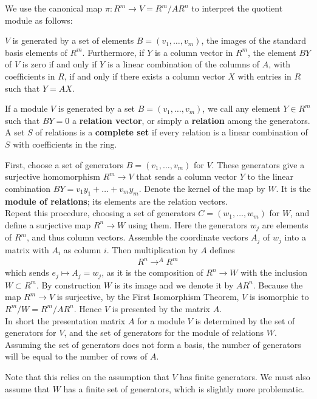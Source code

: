 \documentclass{memoir}
\begin{document}
We use the canonical map \(\pi:R^{m}\to V = R^{m} / AR^{n}\) to interpret the quotient module as follows:
\begin{prop}
\(V\) is generated by a set of elements \(B = (v_1,\ldots,v_m)\), the images of the standard basis elements of \(R^{m}\). Furthermore, if \(Y\) is a column vector in \(R^{m}\), the element \(BY\) of \(V\) is zero if and only if \(Y\) is a linear combination of the columns of \(A\), with coefficients in \(R\), if and only if there exists a column vector \(X\) with entries in \(R\) such that \(Y=AX\).
\end{prop}
If a module \(V\) is generated by a set \(B = (v_1,\ldots,v_m)\), we call any element \(Y \in R^{m}\) such that \(BY = 0\) a \textbf{relation vector}, or simply a \textbf{relation} among the generators. A set \(S\) of relations is a \textbf{complete set} if every relation is a linear combination of \(S\) with coefficients in the ring.
\begin{prop}
	First, choose a set of generators \(B = (v_1,\ldots,v_m)\) for \(V\). These generators give a surjective homomorphism \(R^{m}\to V\) that sends a column vector \(Y\) to the linear combination \(BY = v_1y_1+\ldots+v_my_m\). Denote the kernel of the map by \(W\). It is the \textbf{module of relations}; its elements are the relation vectors.\\

	Repeat this procedure, choosing a set of generators \(C = (w_1,\ldots,w_m)\) for \(W\), and define a surjective map \(R^{n}\to W\) using them. Here the generators \(w_j\) are elements of \(R^{m}\), and thus column vectors. Assemble the coordinate vectors \(A_j\) of \(w_j\) into a matrix with \(A_i\) as column \(i\). Then multiplication by \(A\) defines
	\begin{align*}
		R^{n}\to^{A} R^{m}
	\end{align*}
	which sends \(e_j \mapsto A_j = w_j\), as it is the composition of \(R^{n}\to W\) with the inclusion \(W \subset R^{m}\). By construction \(W\) is its image and we denote it by \(AR^{n}\). Because the map \(R^{m}\to V\) is surjective, by the First Isomorphism Theorem, \(V\) is isomorphic to \(R^{m}/W = R^{m}/AR^{n}\). Hence \(V\) is presented by the matrix \(A\).\\

	In short the presentation matrix \(A\) for a module \(V\) is determined by the set of generators for \(V\), and the set of generators for the module of relations \(W\). Assuming the set of generators does not form a basis, the number of generators will be equal to the number of rows of \(A\).
\end{prop}
Note that this relies on the assumption that \(V\) has finite generators. We must also assume that \(W\) has a finite set of generators, which is slightly more problematic.
\end{document}
